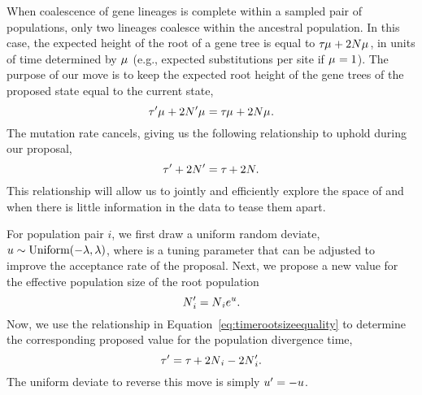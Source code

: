 \begin{linenomath}
When coalescence of gene lineages is complete within a sampled pair of
populations, only two lineages coalesce within the ancestral population.
In this case, the expected height of the root of a gene tree is equal to
$\divtime\murate + 2\sepopsize[\rootpopindex]\murate$,
in units of time determined by $\murate$ (e.g., expected substitutions per site
if $\murate = 1$).
The purpose of our move is to keep the expected root height of the gene trees
of the proposed state equal to the current state,
\begin{equation}
    \divtime\proposed\murate + 2\sepopsize[\rootpopindex]{}\proposed\murate =
    \divtime\murate + 2\sepopsize[\rootpopindex]\murate.
\end{equation}
The mutation rate cancels, giving us the following relationship to uphold
during our proposal,
\begin{equation}
    \divtime\proposed + 2\sepopsize[\rootpopindex]{}\proposed =
    \divtime + 2\sepopsize[\rootpopindex].
    \label{eq:timerootsizeequality}
\end{equation}
This relationship will allow us to jointly and efficiently explore the space of
\divtime and \sepopsize[\rootpopindex] when there is little information in the
data to tease them apart.
\end{linenomath}

\begin{linenomath}
For population pair $i$, we first draw a uniform random deviate,
$\uniformdeviate \sim \textrm{Uniform}(-\tuningparameter, \tuningparameter)$,
where \tuningparameter is a tuning parameter that can be adjusted to 
improve the acceptance rate of the proposal.
Next, we propose a new value for the effective population size of the
root population
\[
    \sepopsize[\rootpopindex]{}_i\proposed = \sepopsize[\rootpopindex]{}_ie^{\uniformdeviate}.
\]
Now, we use the relationship in Equation~\ref{eq:timerootsizeequality} to
determine the corresponding proposed value for the population divergence time,
\begin{equation}
    \divtime\proposed =
    \divtime + 2\sepopsize[\rootpopindex]{}_i - 2\sepopsize[\rootpopindex]{}_i\proposed.
\end{equation}
The uniform deviate to reverse this move is simply
$\uniformdeviate\proposed = -\uniformdeviate$.
\end{linenomath}


